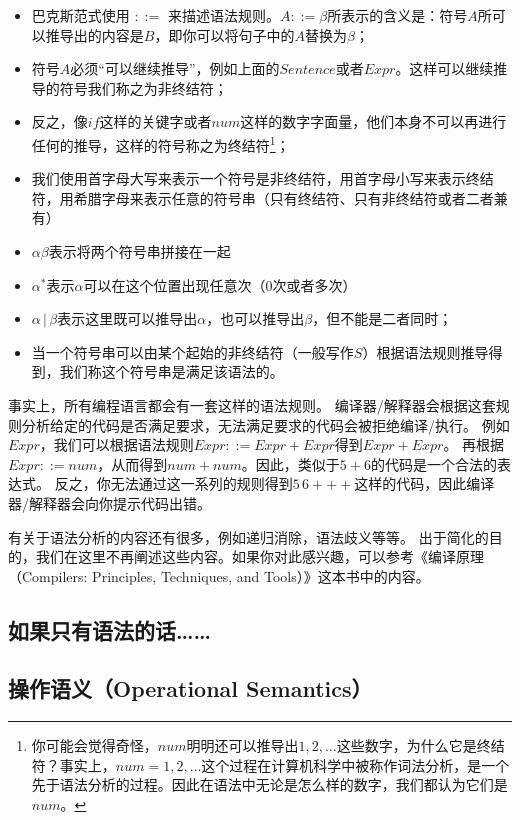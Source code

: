 \documentclass[../main.tex]{subfiles}
\begin{document}
  \begin{itemize}
    \item 巴克斯范式使用 $::=$ 来描述语法规则。$A ::= \beta$所表示的含义是：符号$A$所可以推导出的内容是$B$，即你可以将句子中的$A$替换为$\beta$；
    \item 符号$A$必须“可以继续推导”，例如上面的$Sentence$或者$Expr$。这样可以继续推导的符号我们称之为非终结符；
    \item 反之，像$if$这样的关键字或者$num$这样的数字字面量，他们本身不可以再进行任何的推导，这样的符号称之为终结符\footnote[1]{你可能会觉得奇怪，$num$明明还可以推导出$1, 2, \dots$这些数字，为什么它是终结符？事实上，$num = 1, 2, \dots$这个过程在计算机科学中被称作词法分析，是一个先于语法分析的过程。因此在语法中无论是怎么样的数字，我们都认为它们是$num$。}；
    \item 我们使用首字母大写来表示一个符号是非终结符，用首字母小写来表示终结符，用希腊字母来表示任意的符号串（只有终结符、只有非终结符或者二者兼有）
    \item $\alpha \beta$表示将两个符号串拼接在一起
    \item $\alpha^*$表示$\alpha$可以在这个位置出现任意次（0次或者多次）
    \item $\alpha\,|\,\beta$表示这里既可以推导出$\alpha$，也可以推导出$\beta$，但不能是二者同时；
    \item 当一个符号串可以由某个起始的非终结符（一般写作$S$）根据语法规则推导得到，我们称这个符号串是满足该语法的。
  \end{itemize}

  \indent 事实上，所有编程语言都会有一套这样的语法规则。
  编译器/解释器会根据这套规则分析给定的代码是否满足要求，无法满足要求的代码会被拒绝编译/执行。
  例如$Expr$，我们可以根据语法规则$Expr ::= Expr + Expr$得到$Expr + Expr$。
  再根据$Expr ::= num$，从而得到$num + num$。因此，类似于$5 + 6$的代码是一个合法的表达式。
  反之，你无法通过这一系列的规则得到$5\,6+++$这样的代码，因此编译器/解释器会向你提示代码出错。

  \indent 有关于语法分析的内容还有很多，例如递归消除，语法歧义等等。
  出于简化的目的，我们在这里不再阐述这些内容。如果你对此感兴趣，可以参考《编译原理（Compilers: Principles, Techniques, and Tools）》这本书中的内容。

  \subsection{如果只有语法的话……}

  \subsection{操作语义（Operational Semantics）}
\end{document}
